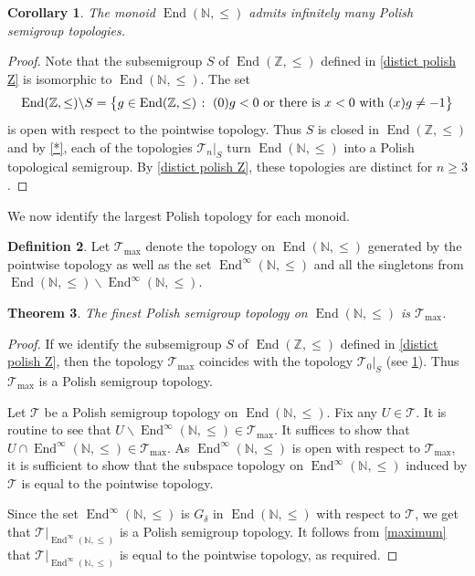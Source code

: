 \documentclass[11pt]{amsart}
\makeatletter
\newtheorem{theorem}{Theorem}[section]
\newtheorem{corollary}[theorem]{Corollary}
\theoremstyle{definition}
\newtheorem{definition}[theorem]{Definition}
\newcommand{\N}{\mathbb N}
\newcommand{\Tau}{\mathcal T}
\newcommand{\Zendd}{\operatorname{End}(\mathbb Z, \leq)}
\newcommand{\Endd}{\operatorname{End}(\mathbb N, \leq)}
\newcommand{\makeset}[2]{\left\lbrace #1 \; \colon\;
 \begin{tabular}{@{}l@{}}
   #2
  \end{tabular}
  \right\rbrace}
\makeatother
\begin{document}
\begin{corollary}\label{infinite polish N}
    The monoid \(\operatorname{End}(\N,\leq)\) admits infinitely many Polish semigroup topologies.
\end{corollary}
\begin{proof}
Note that the subsemigroup \(S\) of \(\Zendd\) defined in \cref{distict polish Z} is isomorphic to \(\operatorname{End}(\N,\leq)\). The set
\[\Zendd \backslash S= \makeset{g\in \Zendd}{\((0)g <0\) or there is \(x<0\) with \((x)g\neq -1\)}\]
is open with respect to the pointwise topology.
Thus $S$ is closed in $\Zendd$ and by \cref{*}, each of the topologies \(\Tau_n|_S\) turn \(\operatorname{End}(\N,\leq)\) into a Polish topological semigroup. By \cref{distict polish Z}, these topologies are distinct for \(n\geq 3\).
\end{proof}

We now identify the largest Polish topology for each monoid.

\begin{definition}
    Let \(\Tau_{\max}\) denote the topology on \(\operatorname{End}(\N,\leq)\) generated by the pointwise topology as well as the set \(\operatorname{End}^\infty(\N,\leq)\) and all the singletons from \(\operatorname{End}(\N,\leq)\backslash\operatorname{End}^\infty(\N,\leq)\).
\end{definition}
\begin{theorem}\label{maxN}
  The finest Polish semigroup topology on \(\operatorname{End}(\N,\leq)\) is \(\Tau_{\max}\).
\end{theorem}
\begin{proof}
If we identify the subsemigroup $S$ of $\Zendd$ defined in \cref{distict polish Z}, then the topology \(\Tau_{\max}\) coincides with the topology $\Tau_0|_S$  (see \cref{infinite polish N}). Thus $\Tau_{\max}$ is a Polish semigroup topology.

Let \(\Tau\) be a Polish semigroup topology on \(\operatorname{End}(\N,\leq)\). Fix any \(U\in \Tau\). It is routine to see that \(U\backslash {\operatorname{End}^\infty(\N,\leq)} \in \Tau_{\max}\). It suffices to show that \(U\cap \operatorname{End}^\infty(\N,\leq) \in \Tau_{\max}\).
As \(\operatorname{End}^\infty(\N,\leq)\) is open with respect to \(\Tau_{\max}\), it is sufficient to show that the subspace topology on \(\operatorname{End}^\infty(\N,\leq)\) induced by \(\Tau\) is equal to the pointwise topology.

    Since the set \(\operatorname{End}^\infty(\N,\leq)\) is \(G_\delta\) in $\Endd$ with respect to \(\Tau\), we get that
    \(\Tau|_{\operatorname{End}^\infty(\N,\leq)}\) is a Polish semigroup topology.
    It follows from \cref{maximum} that \(\Tau|_{\operatorname{End}^\infty(\N,\leq)}\) is equal to the pointwise topology, as required.   
\end{proof}
\end{document}
